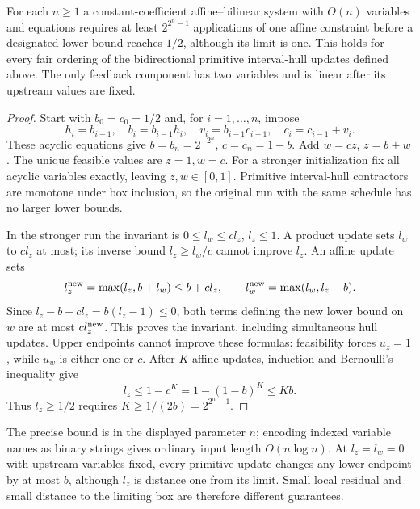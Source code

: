 \begin{proposition}\label{prop:fbbt-iterations}
For each $n\ge1$ a constant-coefficient affine--bilinear system with
$O(n)$ variables and equations requires at least $2^{2^n-1}$ applications
of one affine constraint before a designated lower bound reaches $1/2$,
although its limit is one. This holds for every fair ordering of the
bidirectional primitive interval-hull updates defined above. The only
feedback component has two variables and is linear after its upstream
values are fixed.
\end{proposition}
\begin{proof}
Start with $b_0=c_0=1/2$ and, for $i=1,\ldots,n$, impose
\[
 h_i=b_{i-1},\quad b_i=b_{i-1}h_i,\quad
 v_i=b_{i-1}c_{i-1},\quad c_i=c_{i-1}+v_i.
\]
These acyclic equations give $b=b_n=2^{-2^n}$, $c=c_n=1-b$.
Add $w=cz$, $z=b+w$. The unique feasible values are $z=1,w=c$.
For a stronger initialization fix all acyclic variables exactly, leaving
$z,w\in[0,1]$. Primitive interval-hull contractors are monotone under box
inclusion, so the original run with the same schedule has no larger lower
bounds.

In the stronger run the invariant is $0\le l_w\le cl_z$, $l_z\le1$.
A product update sets $l_w$ to $cl_z$ at most; its inverse bound
$l_z\ge l_w/c$ cannot improve $l_z$. An affine update sets
\[
 l_z^{\rm new}=\max(l_z,b+l_w)\le b+cl_z,\qquad
 l_w^{\rm new}=\max(l_w,l_z-b).
\]
Since $l_z-b-cl_z=b(l_z-1)\le0$, both terms defining the new lower bound
on $w$ are at most $cl_z^{\rm new}$. This proves the invariant, including
simultaneous hull updates. Upper endpoints cannot improve these formulas:
feasibility forces $u_z=1$, while $u_w$ is either one or $c$.
After $K$ affine updates, induction and Bernoulli's inequality give
\[
 l_z\le1-c^K=1-(1-b)^K\le Kb.
\]
Thus $l_z\ge1/2$ requires $K\ge1/(2b)=2^{2^n-1}$.
\end{proof}
The precise bound is in the displayed parameter $n$; encoding indexed
variable names as binary strings gives ordinary input length $O(n\log n)$.
At $l_z=l_w=0$ with upstream variables fixed, every primitive update changes
any lower endpoint by at most $b$, although $l_z$ is distance one from its
limit. Small local residual and small distance to the limiting box are
therefore different guarantees.

